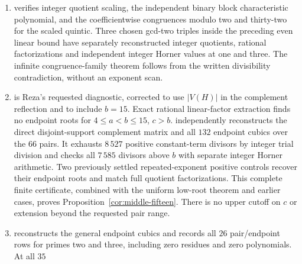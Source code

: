 \begin{enumerate}
gcd-two fixtures below the earlier quadratic cutoff have direct integer
quotient, independent Horner and exact Sturm checks. The existing repeated
triples $(9,9,136)$ and $(10,10,12)$ check the endpoint divisibility
conditions and retain nonlinear rational factors; the latter checks the
strict linear bound. The infinite bound and even-tail corollary use written
positivity and divisibility proofs, without an exponent scan or divisor-set
enumeration. The companion 
checks six substitution identities, two positive boundary shifts and the two
seed endpoint zeros by integer six-by-six determinants. Its all-moduli
conclusion uses the written polynomial-congruence argument; it does not
assert actual zeros or integer spectra for the constructed candidates.
\item {} verifies integer
quotient scaling, the independent binary block characteristic polynomial,
and the coefficientwise congruences modulo two and thirty-two for the
scaled quintic. Three chosen gcd-two triples inside the preceding even
linear bound have separately reconstructed integer quotients, rational
factorizations and independent integer Horner values at one and three.
The infinite congruence-family theorem follows from the written divisibility
contradiction, without an exponent scan.
\item {} is Reza's requested
diagnostic, corrected to use $|V(H)|$ in the complement reflection and
to include $b=15$. Exact rational linear-factor extraction finds no
endpoint roots for $4\leq a<b\leq15$, $c>b$.
 independently reconstructs
the direct disjoint-support complement matrix and all $132$ endpoint
cubics over the $66$ pairs. It exhausts $8\,527$ positive constant-term
divisors by integer trial division and checks all $7\,585$ divisors
above $b$ with separate integer Horner arithmetic. Two previously
settled repeated-exponent positive controls recover their endpoint roots
and match full quotient factorizations. This complete finite certificate,
combined with the uniform low-root theorem and earlier cases, proves
Proposition~\ref{cor:middle-fifteen}. There is no upper cutoff on $c$ or
extension beyond the requested pair range.
\item {} reconstructs the general
endpoint cubics and records all $26$ pair/endpoint rows for primes two
and three, including zero residues and zero polynomials. At all $35$

\end{enumerate}
